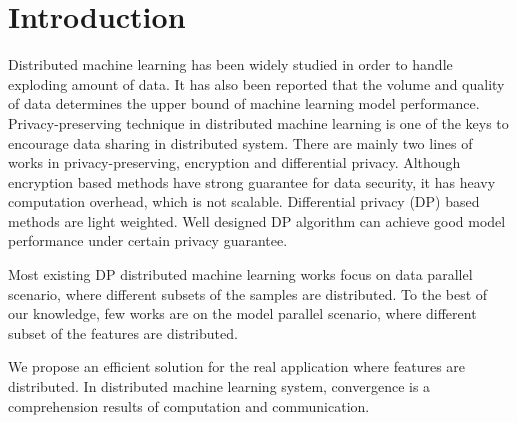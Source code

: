 \section{Introduction}

Distributed machine learning has been widely studied in order to handle exploding amount of data. It has also been reported that the volume and quality of data determines the upper bound of machine learning model performance. Privacy-preserving technique in distributed machine learning is one of the keys to encourage data sharing in distributed system. There are mainly two lines of works in privacy-preserving, encryption and differential privacy. Although encryption based methods have strong guarantee for data security, it has heavy computation overhead, which is not scalable. Differential privacy (DP) based methods are light weighted. Well designed DP algorithm can achieve good model performance under certain privacy guarantee. 

Most existing DP distributed machine learning works focus on data parallel scenario, where different subsets of the samples are distributed. To the best of our knowledge, few works are on the model parallel scenario, where different subset of the features are distributed. 


We propose an efficient solution for the real application where features are distributed. In distributed machine learning system, convergence is a comprehension results of computation and communication. 

